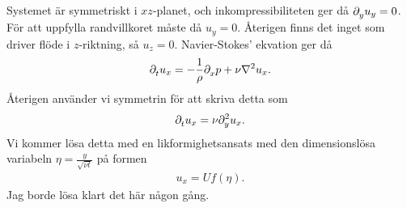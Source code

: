 Systemet är symmetriskt i $xz$-planet, och inkompressibiliteten ger då $\del{y}{u_{y}} = 0$. För att uppfylla randvillkoret måste då $u_{y} = 0$. Återigen finns det inget som driver flöde i $z$-riktning, så $u_{z} = 0$. Navier-Stokes' ekvation ger då
\begin{align*}
	\del{t}{u_{x}} = -\frac{1}{\rho}\del{x}{p} + \nu\laplacian{u_{x}}.
\end{align*}
Återigen använder vi symmetrin för att skriva detta som
\begin{align*}
	\del{t}{u_{x}} = \nu\del[2]{y}{u_{x}}.
\end{align*}
Vi kommer lösa detta med en likformighetsansats med den dimensionslösa variabeln $\eta = \frac{y}{\sqrt{\nu t}}$ på formen
\begin{align*}
	u_{x} = Uf(\eta).
\end{align*}
Jag borde lösa klart det här någon gång.
